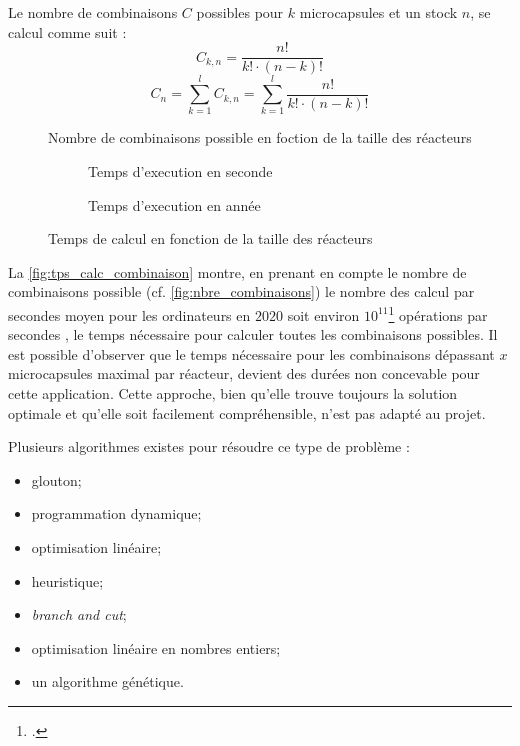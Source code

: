 Le nombre de combinaisons $C$ possibles pour $k$ microcapsules et un stock $n$, se calcul comme suit :
\begin{equation}
    C_{k,n} = \frac{n!}{k!\cdot(n-k)!}
    \label{eq:combinaison}
\end{equation}
\begin{equation}
    C_{n} = \sum_{k = 1}^{l} C_{k,n} = \sum_{k=1}^{l}\frac{n!}{k!\cdot (n-k)!}
    \label{eq:nbre_combinaisons}
\end{equation} 
\begin{figure}[H]
    \centering
    
    \caption{Nombre de combinaisons possible en foction de la taille des réacteurs}
    \label{fig:nbre_combinaisons}
\end{figure}

\begin{figure}[H]
    \centering
    \begin{subfigure}{0.5\textwidth}
        \centering
        
        \caption{Temps d'execution en seconde}
    \end{subfigure}\hfill
    \begin{subfigure}{0.5\textwidth}
        \centering
        
        \caption{Temps d'execution en année}
    \end{subfigure}
    \caption{Temps de calcul en fonction de la taille des réacteurs}
    \label{fig:tps_calc_combinaison}
\end{figure}
La \autoref{fig:tps_calc_combinaison} montre, en prenant en compte le nombre de combinaisons possible (cf. \autoref{fig:nbre_combinaisons}) le nombre des calcul par secondes moyen pour les ordinateurs en $2020$ soit environ $10^{11}$\footcite{petite_analyse_nbre_calculs_par_sec} opérations par secondes , le temps nécessaire pour calculer toutes les combinaisons possibles. Il est possible d'observer que le temps nécessaire pour les combinaisons dépassant $x$ microcapsules maximal par réacteur, devient des durées non concevable pour cette application.
Cette approche, bien qu'elle trouve toujours la solution optimale et qu'elle soit facilement compréhensible, n'est pas adapté au projet.

Plusieurs algorithmes existes pour résoudre ce type de problème : 
\begin{itemize}
    \item glouton;
    \item programmation dynamique;
    \item optimisation linéaire;
    \item heuristique;
    \item \textit{branch and cut};
    \item optimisation linéaire en nombres entiers;
    \item un algorithme génétique.
    \label{list:liste_algorithme}
\end{itemize}

